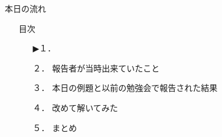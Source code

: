 \begin{frame}{本日の流れ}
  \begin{itemize}
     \item[] 目次
     \begin{itemize}[itemsep=1.3ex, leftmargin=1cm]
        \item[▶１．] 
        \item[２．] 報告者が当時出来ていたこと
        \item[３．] 本日の例題と以前の勉強会で報告された結果
        \item[４．] 改めて解いてみた
        \item[５．] まとめ
     \end{itemize}
  \end{itemize}
\end{frame}
